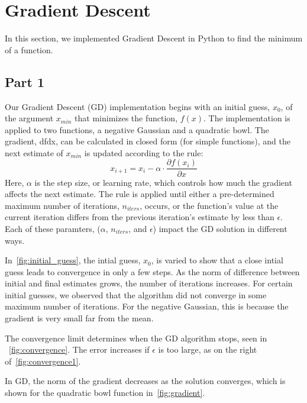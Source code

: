 \section{Gradient Descent} \label{sec:prob1}
In this section, we implemented Gradient Descent in Python to find the minimum of a function.

\subsection{Part 1}
Our Gradient Descent (GD) implementation begins with an initial guess, $x_0$, of the argument $x_{min}$ that minimizes the function, $f(x)$.
The implementation is applied to two functions, a negative Gaussian and a quadratic bowl.
The gradient, dfdx, can be calculated in closed form (for simple functions), and the next estimate of $x_{min}$ is updated according to the rule:
\begin{equation}
x_{i+1} = x_i - \alpha \cdot \frac{\partial f(x_i)}{\partial x}
\label{eq:gd}
\end{equation}
Here, $\alpha$ is the step size, or learning rate, which controls how much the gradient affects the next estimate.
The rule is applied until either a pre-determined maximum number of iterations, $n_{iters}$, occurs, or the function's value at the current iteration differs from the previous iteration's estimate by less than $\epsilon$.
Each of these paramters, ($\alpha$, $n_{iters}$, and $\epsilon$) impact the GD solution in different ways.

In~\cref{fig:initial_guess}, the intial guess, $x_0$, is varied to show that a close intial guess leads to convergence in only a few steps.
As the norm of difference between initial and final estimates grows, the number of iterations increases.
For certain initial guesses, we observed that the algorithm did not converge in some maximum number of iterations.
For the negative Gaussian, this is because the gradient is very small far from the mean.

The convergence limit determines when the GD algorithm stops, seen in ~\cref{fig:convergence}.
The error increases if $\epsilon$ is too large, as on the right of~\cref{fig:convergence1}.

In GD, the norm of the gradient decreases as the solution converges, which is shown for the quadratic bowl function in~\cref{fig:gradient}.


